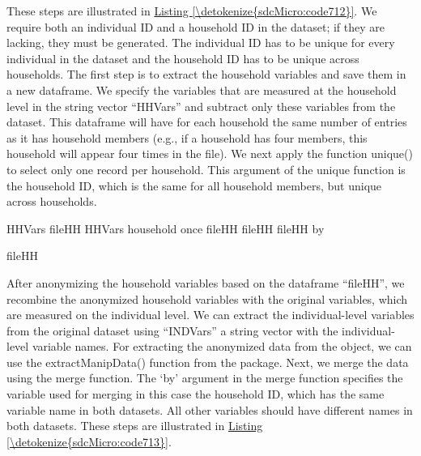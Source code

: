 \documentclass[letterpaper,10pt,english]{sphinxmanual}
\begin{document}
These steps are illustrated in \hyperref[\detokenize{sdcMicro:code712}]{Listing \ref{\detokenize{sdcMicro:code712}}}. We require both an
individual ID and a household ID in the dataset; if they are lacking,
they must be generated. The individual ID has to be unique for every
individual in the dataset and the household ID has to be unique across
households. The first step is to extract the household variables and
save them in a new dataframe. We specify the variables that are measured
at the household level in the string vector “HHVars” and subtract only
these variables from the dataset. This dataframe will have for each
household the same number of entries as it has household members (e.g.,
if a household has four members, this household will appear four times
in the file). We next apply the function unique() to select only one
record per household. This argument of the unique function is the
household ID, which is the same for all household members, but unique
across households.

\def\sphinxLiteralBlockLabel{\label{\detokenize{sdcMicro:code712}}}
%
\begin{sphinxVerbatim}[commandchars=\\\{\},numbers=left,firstnumber=1,stepnumber=1]

     HHVars   
     fileHH  \PYG{p}{[}HHVars\PYG{p}{]}
     household once  fileHH
     fileHH  fileHH by  

     fileHH
\end{sphinxVerbatim}

After anonymizing the household variables based on the dataframe
“fileHH”, we recombine the anonymized household variables with the
original variables, which are measured on the individual level. We can
extract the individual-level variables from the original dataset using
“INDVars” \textendash{} a string vector with the individual-level variable names.
For extracting the anonymized data from the  object, we can
use the extractManipData() function from the  package. Next,
we merge the data using the merge function. The ‘by’ argument in the
merge function specifies the variable used for merging \textendash{} in this case
the household ID, which has the same variable name in both datasets. All
other variables should have different names in both datasets. These
steps are illustrated in \hyperref[\detokenize{sdcMicro:code713}]{Listing \ref{\detokenize{sdcMicro:code713}}}.
\end{document}

